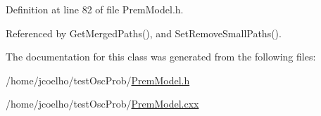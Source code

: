 Definition at line 82 of file Prem\+Model.\+h.



Referenced by Get\+Merged\+Paths(), and Set\+Remove\+Small\+Paths().



The documentation for this class was generated from the following files\+:\begin{DoxyCompactItemize}
\item 
/home/jcoelho/test\+Osc\+Prob/\hyperlink{PremModel_8h}{Prem\+Model.\+h}\item 
/home/jcoelho/test\+Osc\+Prob/\hyperlink{PremModel_8cxx}{Prem\+Model.\+cxx}\end{DoxyCompactItemize}
